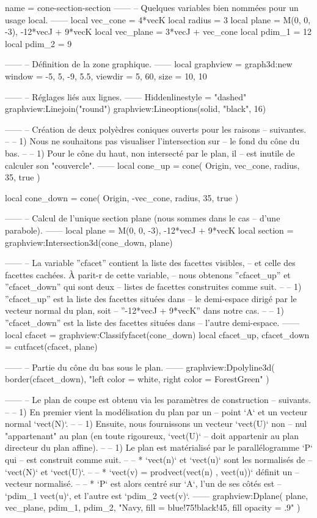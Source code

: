 \documentclass{standalone}
\begin{document}
\begin{luadraw}{name = cone-section-section}
------
-- Quelques variables bien nommées pour un usage local.
------
local vec_cone  = 4*vecK
local radius  = 3
local plane   = {M(0, 0, -3), -12*vecJ + 9*vecK}
local vec_plane = 3*vecJ + vec_cone
local pdim_1  = 12
local pdim_2  = 9

------
-- Définition de la zone graphique.
------
local graphview = graph3d:new{
  window  = {-5, 5, -9, 5.5},
  viewdir = {5, 60},
  size  = {10, 10}
}

------
-- Réglages liés aux lignes.
------
Hiddenlinestyle = "dashed"
graphview:Linejoin("round")
graphview:Lineoptions(solid, "black", 16)

------
-- Création de deux polyèdres coniques ouverts pour les raisons
-- suivantes.
--
--     1) Nous ne souhaitons pas visualiser l'intersection sur
--     le fond du cône du bas.
--
--     1) Pour le cône du haut, non intersecté par le plan, il
--     est inutile de calculer son "couvercle".
------
local cone_up = cone(
  Origin, vec_cone, radius,
  35,
  true
)

local cone_down = cone(
  Origin, -vec_cone, radius,
  35,
  true
)

------
-- Calcul de l'unique section plane (nous sommes dans le cas
-- d'une parabole).
------
local plane   = {M(0, 0, -3), -12*vecJ + 9*vecK}
local section = graphview:Intersection3d(cone_down, plane)

------
-- La variable ''cfacet'' contient la liste des facettes visibles,
-- et celle des facettes cachées. À parit-r de cette variable,
-- nous obtenons ''cfacet_up'' et ''cfacet_down'' qui sont deux
-- listes de facettes construites comme suit.
--
--   1) ''cfacet_up'' est la liste des facettes situées dans
--   le demi-espace dirigé par le vecteur normal du plan, soit
--   ''-12*vecJ + 9*vecK'' dans notre cas.
--
--   1) ''cfacet_down'' est la liste des facettes situées dans
--   l’autre demi-espace.
------
local cfacet         = graphview:Classifyfacet(cone_down)
local cfacet_up, cfacet_down = cutfacet(cfacet, plane)

------
-- Partie du cône du bas sous le plan.
------
graphview:Dpolyline3d(
  border(cfacet_down),
  "left color = white, right color = ForestGreen"
)

------
-- Le plan de coupe est obtenu via les paramètres de construction
-- suivants.
--
--     1) En premier vient la modélisation du plan par un
--     point `A` et un vecteur normal `vect(N)`.
--
--     1) Ensuite, nous fournissons un vecteur `vect(U)` non
--     nul "appartenant" au plan (en toute rigoureux, `vect(U)`
--     doit appartenir au plan directeur du plan affine).
--
--     1) Le plan est matérialisé par le parallélogramme `P` qui
--     est construit comme suit.
--
--         * `vect(n)` et `vect(u)` sont les normalisés de
--         `vect(N)` et `vect(U)`.
--
--         * `vect(v) = prodvect(vect(n) , vect(u))` définit un
--         vecteur normalisé.
--
--         * `P` est alors centré sur `A`, l'un de ses côtés est
--         `pdim_1 vect(u)`, et l'autre est `pdim_2 vect(v)`.
------
graphview:Dplane(
  plane,
  vec_plane, pdim_1, pdim_2,
  "Navy, fill = blue!75!black!45, fill opacity = .9"
)


\end{luadraw}
\end{document}
